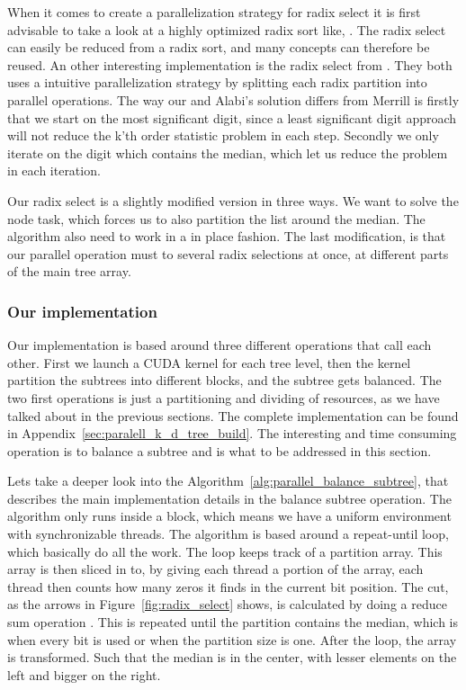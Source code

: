 When it comes to create a parallelization strategy for radix select it is first advisable to take a look at a highly optimized radix sort like, \citep{MerrillG11}. The radix select can easily be reduced from a radix sort, and many concepts can therefore be reused. An other interesting implementation is the radix select from \citep{Alabi:2012}. They both uses a intuitive parallelization strategy by splitting each radix partition into parallel operations. The way our and Alabi's solution differs from Merrill is firstly that we start on the most significant digit, since a least significant digit approach will not reduce the k'th order statistic problem in each step. Secondly we only iterate on the digit which contains the median, which let us reduce the problem in each iteration.

Our radix select is a slightly modified version in three ways. We want to solve the node task, which forces us to also partition the list around the median. The algorithm also need to work in a in place fashion. The last modification, is that our parallel operation must to several radix selections at once, at different parts of the main tree array.


\subsubsection{Our implementation} %
\label{ssub:our_implementation}



Our implementation is based around three different operations that call each other. First we launch a CUDA kernel for each tree level, then the kernel partition the subtrees into different blocks, and the subtree gets balanced. The two first operations is just a partitioning and dividing of resources, as we have talked about in the previous sections. The complete implementation can be found in Appendix~\ref{sec:paralell_k_d_tree_build}. The interesting and time consuming operation is to balance a subtree and is what to be addressed in this section.


Lets take a deeper look into the Algorithm~\ref{alg:parallel_balance_subtree}, that describes the main implementation details in the balance subtree operation. The algorithm only runs inside a block, which means we have a uniform environment with synchronizable threads. The algorithm is based around a repeat-until loop, which basically do all the work. The loop keeps track of a partition array. This array is then sliced in to, by giving each thread a portion of the array, each thread then counts how many zeros it finds in the current bit position. The cut, as the arrows in Figure~\ref{fig:radix_select} shows, is calculated by doing a reduce sum operation \citep{parallel_reduction_in_cuda}. This is repeated until the partition contains the median, which is when every bit is used or when the partition size is one. After the loop, the array is transformed. Such that the median is in the center, with lesser elements on the left and bigger on the right.

